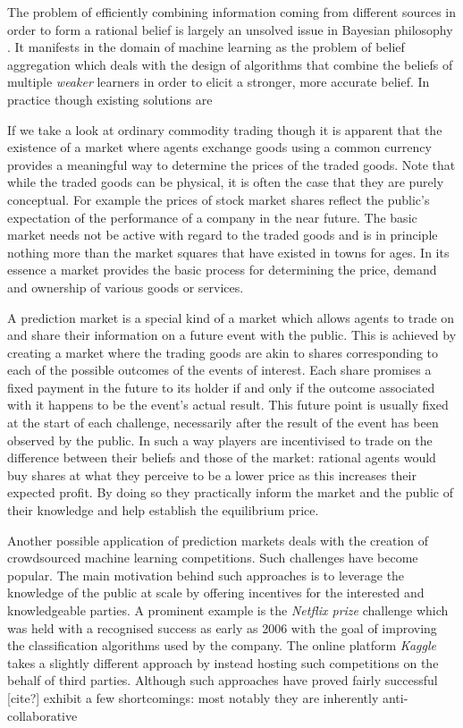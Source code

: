 \documentclass[bsc,frontabs,twoside,singlespacing,parskip,deptreport]{infthesis}     %
\begin{document}
The problem of efficiently combining information coming from different sources in order to form a rational belief is largely an unsolved issue in Bayesian philosophy \cite{greene_collective_2010}. It manifests in the domain of machine learning as the problem of belief aggregation which deals with the design of algorithms that combine the beliefs of multiple {\em weaker} learners in order to elicit a stronger, more accurate belief. In practice though existing solutions are 

	If we take a look at ordinary commodity trading though it is apparent that the existence of a market where agents exchange goods using a common currency provides a meaningful way to determine the prices of the traded goods. Note that while the traded goods can be physical, it is often the case that they are purely conceptual. For example the prices of stock market shares reflect the public's expectation of the performance of a company in the near future. The basic market needs not be active with regard to the traded goods and is in principle nothing more than the market squares that have existed in towns for ages. In its essence a market provides the basic process for determining the price, demand and ownership of various goods or services. 

	A prediction market is a special kind of a market which allows agents to trade on and share their information on a future event with the public. This is achieved by creating a market where the trading goods are akin to shares corresponding to each of the possible outcomes of the events of interest. Each share promises a fixed payment in the future to its holder if and only if the outcome associated with it happens to be the event's actual result. This future point is usually fixed at the start of each challenge, necessarily after the result of the event has been observed by the public. In such a way players are incentivised to trade on the difference between their beliefs and those of the market: rational agents would buy shares at what they perceive to be a lower price as this increases their expected profit. By doing so they practically inform the market and the public of their knowledge and help establish the equilibrium price. 

	Another possible application of prediction markets deals with the creation of crowdsourced machine learning competitions. Such challenges have become popular. The main motivation behind such approaches is to leverage the knowledge of the public at scale by offering incentives for the interested and knowledgeable parties. A prominent example is the {\em Netflix prize} challenge which was held with a recognised success as early as 2006 with the goal of improving the classification algorithms used by the company\cite{bennett_netflix_2007}. The online platform {\em Kaggle} takes a slightly different approach by instead hosting such competitions on the behalf of third parties. Although such approaches have proved fairly successful [cite?] exhibit a few shortcomings: most notably they are inherently anti-collaborative 
\end{document}
